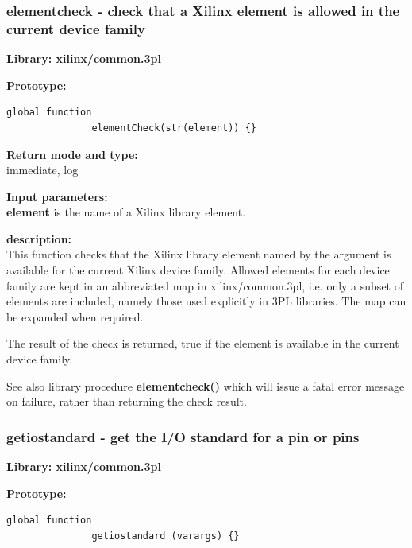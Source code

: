         \subsubsection{elementcheck - check that a Xilinx element is allowed in the current device family}\label{sec:lfelementcheck}
            
            {\bf Library: xilinx/common.3pl}

            {\bf Prototype:} \\
            \vsp
            \begin{lstlisting}[gobble=12, language=threepl]
               global function
               elementCheck(str(element)) {}
            \end{lstlisting}

            {\bf Return mode and type:} \\
            immediate, log

            {\bf Input parameters:} \\            
            {\bf element} is the name of a Xilinx library element.

            {\bf description:} \\
            This function checks that the Xilinx library element named by the
            argument is available for the current Xilinx device family. Allowed elements
            for each device family are kept in an abbreviated map in xilinx/common.3pl,
            i.e. only a subset of elements are included, namely those used explicitly
            in 3PL libraries. The map can be expanded when required.
            
            The result of the check is returned, true if the element is available in the
            current device family.
            
            See also library procedure {\bf elementcheck()} 
            which will issue a fatal error message on failure, rather than returning
            the check result.


        \subsubsection{getiostandard - get the I/O standard for a pin or pins}\label{sec:lfgetiostandard}
            
            {\bf Library: xilinx/common.3pl}

            {\bf Prototype:} \\
            \vsp
            \begin{lstlisting}[gobble=12, language=threepl]
               global function
               getiostandard (varargs) {}
            \end{lstlisting}

